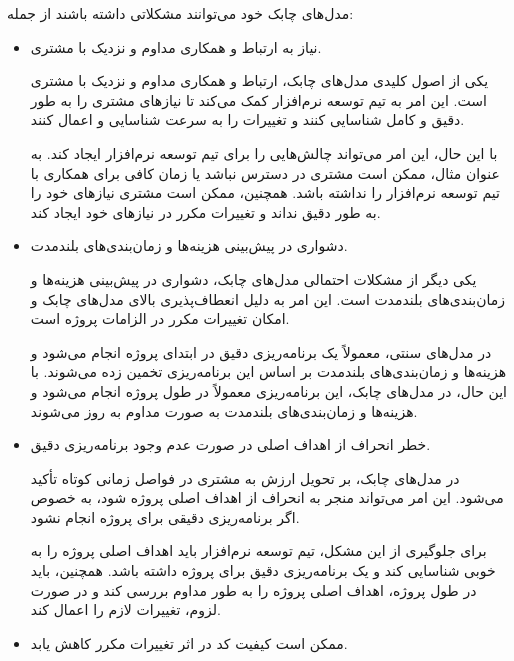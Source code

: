 مدل‌های چابک خود می‌توانند مشکلاتی داشته باشند از جمله:
\begin{itemize}
	\item نیاز به ارتباط و همکاری مداوم و نزدیک با مشتری.
	
	یکی از اصول کلیدی مدل‌های چابک، ارتباط و همکاری مداوم و نزدیک با مشتری است. این امر به تیم توسعه نرم‌افزار کمک می‌کند تا نیازهای مشتری را به طور دقیق و کامل شناسایی کنند و تغییرات را به سرعت شناسایی و اعمال کنند.
	
	با این حال، این امر می‌تواند چالش‌هایی را برای تیم توسعه نرم‌افزار ایجاد کند. به عنوان مثال، ممکن است مشتری در دسترس نباشد یا زمان کافی برای همکاری با تیم توسعه نرم‌افزار را نداشته باشد. همچنین، ممکن است مشتری نیازهای خود را به طور دقیق نداند و تغییرات مکرر در نیازهای خود ایجاد کند.
	
	\item دشواری در پیش‌بینی هزینه‌ها و زمان‌بندی‌های بلندمدت.
	
	یکی دیگر از مشکلات احتمالی مدل‌های چابک، دشواری در پیش‌بینی هزینه‌ها و زمان‌بندی‌های بلندمدت است. این امر به دلیل انعطاف‌پذیری بالای مدل‌های چابک و امکان تغییرات مکرر در الزامات پروژه است.
	
	در مدل‌های سنتی، معمولاً یک برنامه‌ریزی دقیق در ابتدای پروژه انجام می‌شود و هزینه‌ها و زمان‌بندی‌های بلندمدت بر اساس این برنامه‌ریزی تخمین زده می‌شوند. با این حال، در مدل‌های چابک، این برنامه‌ریزی معمولاً در طول پروژه انجام می‌شود و هزینه‌ها و زمان‌بندی‌های بلندمدت به صورت مداوم به روز می‌شوند.
	
	\item خطر انحراف از اهداف اصلی در صورت عدم وجود برنامه‌ریزی دقیق.
	
	در مدل‌های چابک، بر تحویل ارزش به مشتری در فواصل زمانی کوتاه تأکید می‌شود. این امر می‌تواند منجر به انحراف از اهداف اصلی پروژه شود، به خصوص اگر برنامه‌ریزی دقیقی برای پروژه انجام نشود.
	
	برای جلوگیری از این مشکل، تیم توسعه نرم‌افزار باید اهداف اصلی پروژه را به خوبی شناسایی کند و یک برنامه‌ریزی دقیق برای پروژه داشته باشد. همچنین، باید در طول پروژه، اهداف اصلی پروژه را به طور مداوم بررسی کند و در صورت لزوم، تغییرات لازم را اعمال کند.
	
	\item ممکن است کیفیت کد در اثر تغییرات مکرر کاهش یابد.
\end{itemize}

